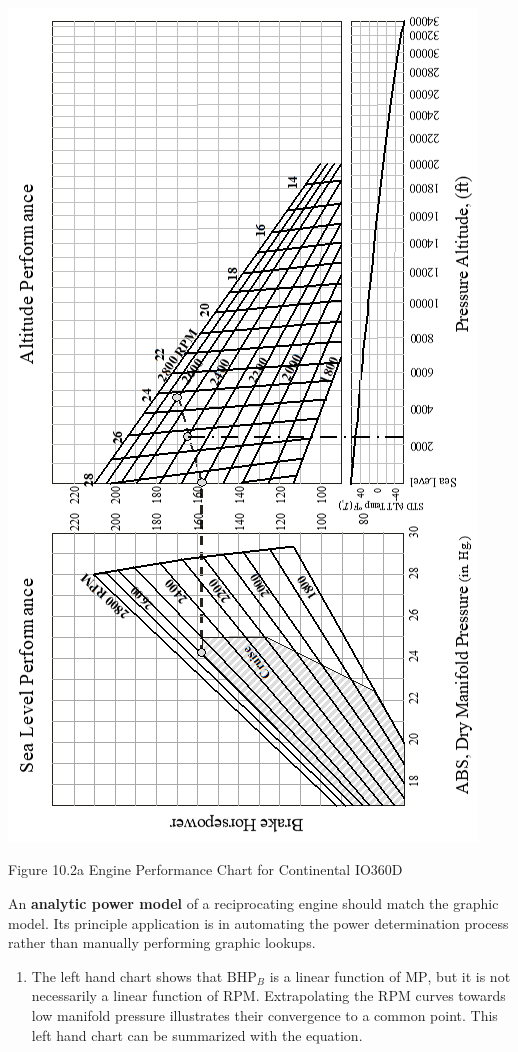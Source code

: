 \documentclass[
]{book}
\providecommand{\tightlist}{%
  \setlength{\itemsep}{0pt}\setlength{\parskip}{0pt}}
\begin{document}
\includegraphics[width=4.89514in,height=8.68611in]{media/10/image1.png}

Figure 10.2a Engine Performance Chart for Continental IO360D

An \textbf{analytic power model} of a reciprocating engine should match the graphic model.
Its principle application is in automating the power determination process rather than manually performing graphic lookups.

\begin{enumerate}
\def\labelenumi{\arabic{enumi}.}
\tightlist
\item
  The left hand chart shows that \(\mathrm{BHP}_B\) is a linear function of \(\mathrm{MP}\), but it is not necessarily a linear function of \(\mathrm{RPM}\).
  Extrapolating the \(\mathrm{RPM}\) curves towards low manifold pressure illustrates their convergence to a common point.
  This left hand chart can be summarized with the equation.
\end{enumerate}
\end{document}
